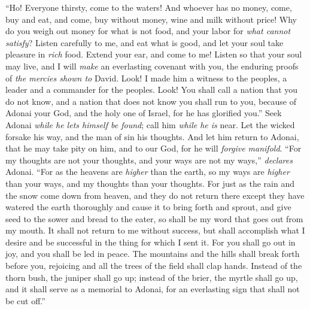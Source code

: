 \begin{biblechapter} %
 “Ho! Everyone thirsty, come to the waters! 
And whoever has no money, come, buy and eat, 
and come, buy without money, 
wine and milk without price!
\verse Why do you weigh out money for what is not food, 
and your labor for \textit{what cannot satisfy}? 
Listen carefully to me, and eat what is good, 
and let your soul take pleasure in \textit{rich} food.
\verse Extend your ear, and come to me! 
Listen so that your soul may live, 
and I will \textit{make} an everlasting covenant with you, 
the enduring proofs of \textit{the mercies shown to} David.
\verse Look! I made him a witness to the peoples, 
a leader and a commander for the peoples.
\verse Look! You shall call a nation that you do not know, 
and a nation that does not know you shall run to you, 
because of Adonai your God, 
and the holy one of Israel, for he has glorified you.”
\verse Seek Adonai \textit{while he lets himself be found}; 
call him \textit{while he is} near.
\verse Let the wicked forsake his way, 
and the man of sin his thoughts. 
And let him return to Adonai, that he may take pity on him, 
and to our God, for he will \textit{forgive manifold}.
\verse “For my thoughts are not your thoughts, 
and your ways are not my ways,” \textit{declares} Adonai.
\verse “For as the heavens are \textit{higher} than the earth, 
so my ways are \textit{higher} than your ways, 
and my thoughts than your thoughts.
\verse For just as the rain and the snow come down from heaven, 
and they do not return there 
except they have watered the earth thoroughly 
and cause it to bring forth and sprout, 
and give seed to the sower 
and bread to the eater,
\verse so shall be my word that goes out from my mouth. 
It shall not return to me without success, 
but shall accomplish what I desire 
and be successful in the thing for which I sent it.
\verse For you shall go out in joy, 
and you shall be led in peace. 
The mountains and the hills shall break forth before you, rejoicing 
and all the trees of the field shall clap hands.
\verse Instead of the thorn bush, the juniper shall go up; 
instead of the brier, the myrtle shall go up, 
and it shall serve as a memorial to Adonai, 
for an everlasting sign that shall not be cut off.”
\end{biblechapter}

